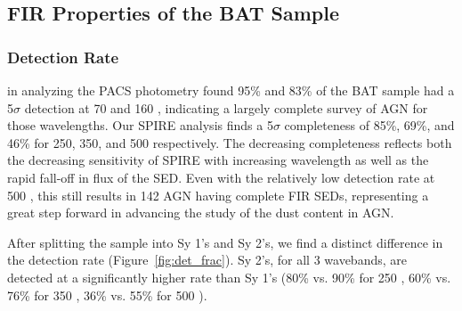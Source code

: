 \subsection{FIR Properties of the BAT Sample }
\subsubsection{Detection Rate}
\citet{Melendez:2014yu} in analyzing the PACS photometry found 95\% and 83\% of the BAT sample had a 5$\sigma$ detection at 70 and 160 \micron, indicating a largely complete survey of AGN for those wavelengths. Our SPIRE analysis finds a 5$\sigma$ completeness of 85\%, 69\%, and 46\% for 250, 350, and 500 \micron{} respectively. The decreasing completeness reflects both the decreasing sensitivity of SPIRE with increasing wavelength as well as the rapid fall-off in flux of the SED. Even with the relatively low detection rate at 500 \micron{}, this still results in 142 AGN having complete FIR SEDs, representing a great step forward in advancing the study of the dust content in AGN. 

After splitting the sample into Sy 1's and Sy 2's, we find a distinct difference in the detection rate (Figure~\ref{fig:det_frac}). Sy 2's, for all 3 wavebands, are detected at a significantly higher rate than Sy 1's (80\% vs. 90\% for 250 \micron, 60\% vs. 76\% for 350 \micron, 36\% vs. 55\% for 500 \micron).
